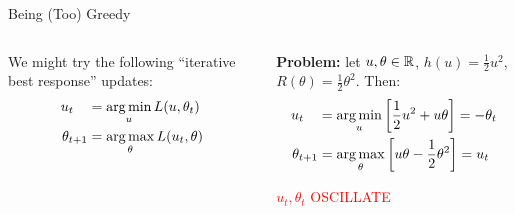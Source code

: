\documentclass[final]{beamer}
\begin{document}
\begin{frame}{}
\begin{columns}
\begin{column}{0.46\linewidth}
\begin{block}{\large Being (Too) Greedy}
\begin{columns}[t]
\begin{column}{.48\linewidth}
We might try the following ``iterative best response'' updates:
\begin{align*}
u_t\,\,\,\,\,\, &= \argmin_{u} L(u,\theta_t) \\
\theta_{t+1}   &= \argmax_{\theta} L(u_t, \theta)
\end{align*}
\end{column}
\begin{column}{.48\linewidth}
{\bf Problem:} let $u,\theta \in \mathbb{R}$, $h(u) = \frac{1}{2}u^2$, $R(\theta) = \frac{1}{2}\theta^2$. 
Then:
\begin{align*}
u_t\,\,\,\,\,\, &= \argmin_u \left[\frac{1}{2}u^2 + u\theta\right]             = -\theta_t \\
\theta_{t+1}    &= \argmax_{\theta} \left[u\theta - \frac{1}{2}\theta^2\right] = u_t
\end{align*}
\begin{center}
\textcolor{red}{$u_t,\theta_t$ OSCILLATE}
\end{center}
\end{column}
\end{columns}
\end{block}


\end{column}
\end{columns}
\end{frame}
\end{document}
